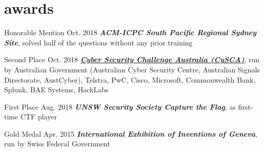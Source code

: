 \documentclass[hidelinks__VERSION__]{adamyi-cv}
\begin{document}


\section{awards}

\begin{entrylist}


\entry
{Honorable Mention}
{Oct. 2018}
{\emph{\textbf{ACM-ICPC South Pacific Regional Sydney Site}}, solved half of the questions without any prior training
}


\entry
{Second Place}
{Oct. 2018}
{\emph{\textbf{\href{https://www.cyberchallenge.com.au/}{Cyber Security Challenge Australia (CySCA)}}}, run by Australian Government (Australian Cyber Security Centre, Australian Signals Directorate, AustCyber), Telstra, PwC, Cisco, Microsoft, Commonwealth Bank, Splunk, BAE Systems, HackLabs
}


\entry
{First Place}
{Aug. 2018}
{\emph{\textbf{UNSW Security Society Capture the Flag}}, as first-time CTF player
}


\entry
{Gold Medal}
{Apr. 2015}
{\emph{\textbf{International Exhibition of Inventions of Geneva}}, run by Swiss Federal Government
}


\end{entrylist}

\end{document}
